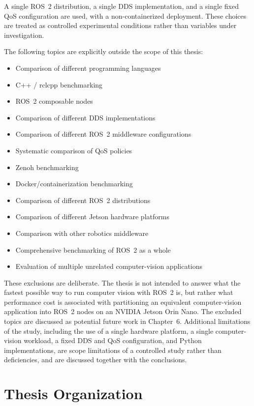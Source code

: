 A single ROS~2 distribution, a single DDS implementation, and a single
fixed QoS configuration are used, with a non-containerized deployment.
These choices are treated as controlled experimental conditions rather
than variables under investigation.

The following topics are explicitly outside the scope of this thesis:

\begin{itemize}
  \item Comparison of different programming languages
  \item C++ / rclcpp benchmarking
  \item ROS~2 composable nodes
  \item Comparison of different DDS implementations
  \item Comparison of different ROS~2 middleware configurations
  \item Systematic comparison of QoS policies
  \item Zenoh benchmarking
  \item Docker/containerization benchmarking
  \item Comparison of different ROS~2 distributions
  \item Comparison of different Jetson hardware platforms
  \item Comparison with other robotics middleware
  \item Comprehensive benchmarking of ROS~2 as a whole
  \item Evaluation of multiple unrelated computer-vision applications
\end{itemize}

These exclusions are deliberate. The thesis is not intended to answer what
the fastest possible way to run computer vision with ROS~2 is, but rather
what performance cost is associated with partitioning an equivalent
computer-vision application into ROS~2 nodes on an NVIDIA Jetson Orin
Nano. The excluded topics are discussed as potential future work in
Chapter~6. Additional limitations of the study, including the use of a
single hardware platform, a single computer-vision workload, a fixed DDS
and QoS configuration, and Python implementations, are scope limitations
of a controlled study rather than deficiencies, and are discussed together
with the conclusions.

\section{Thesis Organization}
\label{sec:organization}

